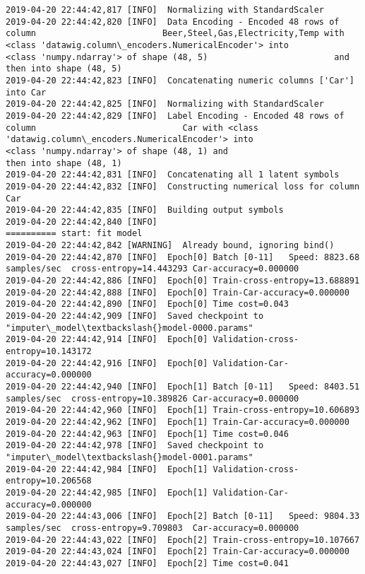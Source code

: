 \documentclass[11pt]{article}
\begin{document}
\begin{Verbatim}[commandchars=\\\{\}]
2019-04-20 22:44:42,817 [INFO]  Normalizing with StandardScaler
2019-04-20 22:44:42,820 [INFO]  Data Encoding - Encoded 48 rows of column                         Beer,Steel,Gas,Electricity,Temp with <class 'datawig.column\_encoders.NumericalEncoder'> into                         <class 'numpy.ndarray'> of shape (48, 5)                         and then into shape (48, 5)
2019-04-20 22:44:42,823 [INFO]  Concatenating numeric columns ['Car'] into Car
2019-04-20 22:44:42,825 [INFO]  Normalizing with StandardScaler
2019-04-20 22:44:42,829 [INFO]  Label Encoding - Encoded 48 rows of column                             Car with <class 'datawig.column\_encoders.NumericalEncoder'> into                             <class 'numpy.ndarray'> of shape (48, 1) and                             then into shape (48, 1)
2019-04-20 22:44:42,831 [INFO]  Concatenating all 1 latent symbols
2019-04-20 22:44:42,832 [INFO]  Constructing numerical loss for column Car
2019-04-20 22:44:42,835 [INFO]  Building output symbols
2019-04-20 22:44:42,840 [INFO]  
========== start: fit model
2019-04-20 22:44:42,842 [WARNING]  Already bound, ignoring bind()
2019-04-20 22:44:42,870 [INFO]  Epoch[0] Batch [0-11]	Speed: 8823.68 samples/sec	cross-entropy=14.443293	Car-accuracy=0.000000
2019-04-20 22:44:42,886 [INFO]  Epoch[0] Train-cross-entropy=13.688891
2019-04-20 22:44:42,888 [INFO]  Epoch[0] Train-Car-accuracy=0.000000
2019-04-20 22:44:42,890 [INFO]  Epoch[0] Time cost=0.043
2019-04-20 22:44:42,909 [INFO]  Saved checkpoint to "imputer\_model\textbackslash{}model-0000.params"
2019-04-20 22:44:42,914 [INFO]  Epoch[0] Validation-cross-entropy=10.143172
2019-04-20 22:44:42,916 [INFO]  Epoch[0] Validation-Car-accuracy=0.000000
2019-04-20 22:44:42,940 [INFO]  Epoch[1] Batch [0-11]	Speed: 8403.51 samples/sec	cross-entropy=10.389826	Car-accuracy=0.000000
2019-04-20 22:44:42,960 [INFO]  Epoch[1] Train-cross-entropy=10.606893
2019-04-20 22:44:42,962 [INFO]  Epoch[1] Train-Car-accuracy=0.000000
2019-04-20 22:44:42,963 [INFO]  Epoch[1] Time cost=0.046
2019-04-20 22:44:42,978 [INFO]  Saved checkpoint to "imputer\_model\textbackslash{}model-0001.params"
2019-04-20 22:44:42,984 [INFO]  Epoch[1] Validation-cross-entropy=10.206568
2019-04-20 22:44:42,985 [INFO]  Epoch[1] Validation-Car-accuracy=0.000000
2019-04-20 22:44:43,006 [INFO]  Epoch[2] Batch [0-11]	Speed: 9804.33 samples/sec	cross-entropy=9.709803	Car-accuracy=0.000000
2019-04-20 22:44:43,022 [INFO]  Epoch[2] Train-cross-entropy=10.107667
2019-04-20 22:44:43,024 [INFO]  Epoch[2] Train-Car-accuracy=0.000000
2019-04-20 22:44:43,027 [INFO]  Epoch[2] Time cost=0.041

\end{Verbatim}
\end{document}
